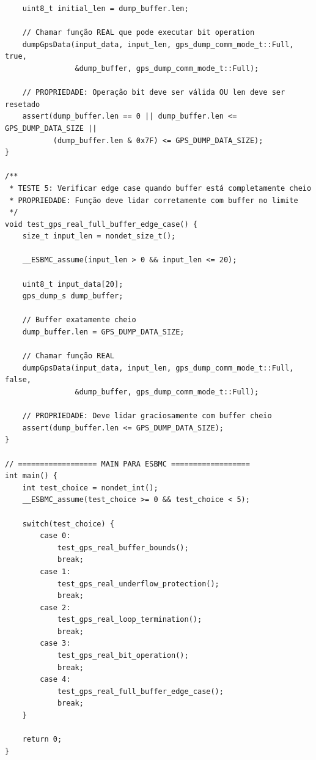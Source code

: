 \begin{lstlisting}
    uint8_t initial_len = dump_buffer.len;
    
    // Chamar função REAL que pode executar bit operation
    dumpGpsData(input_data, input_len, gps_dump_comm_mode_t::Full, true, 
                &dump_buffer, gps_dump_comm_mode_t::Full);
    
    // PROPRIEDADE: Operação bit deve ser válida OU len deve ser resetado
    assert(dump_buffer.len == 0 || dump_buffer.len <= GPS_DUMP_DATA_SIZE || 
           (dump_buffer.len & 0x7F) <= GPS_DUMP_DATA_SIZE);
}

/**
 * TESTE 5: Verificar edge case quando buffer está completamente cheio
 * PROPRIEDADE: Função deve lidar corretamente com buffer no limite
 */
void test_gps_real_full_buffer_edge_case() {
    size_t input_len = nondet_size_t();
    
    __ESBMC_assume(input_len > 0 && input_len <= 20);
    
    uint8_t input_data[20];
    gps_dump_s dump_buffer;
    
    // Buffer exatamente cheio
    dump_buffer.len = GPS_DUMP_DATA_SIZE;
    
    // Chamar função REAL
    dumpGpsData(input_data, input_len, gps_dump_comm_mode_t::Full, false, 
                &dump_buffer, gps_dump_comm_mode_t::Full);
    
    // PROPRIEDADE: Deve lidar graciosamente com buffer cheio
    assert(dump_buffer.len <= GPS_DUMP_DATA_SIZE);
}

// ================== MAIN PARA ESBMC ==================
int main() {
    int test_choice = nondet_int();
    __ESBMC_assume(test_choice >= 0 && test_choice < 5);
    
    switch(test_choice) {
        case 0:
            test_gps_real_buffer_bounds();
            break;
        case 1:
            test_gps_real_underflow_protection();
            break;
        case 2:
            test_gps_real_loop_termination();
            break;
        case 3:
            test_gps_real_bit_operation();
            break;
        case 4:
            test_gps_real_full_buffer_edge_case();
            break;
    }
    
    return 0;
}


\end{lstlisting}
